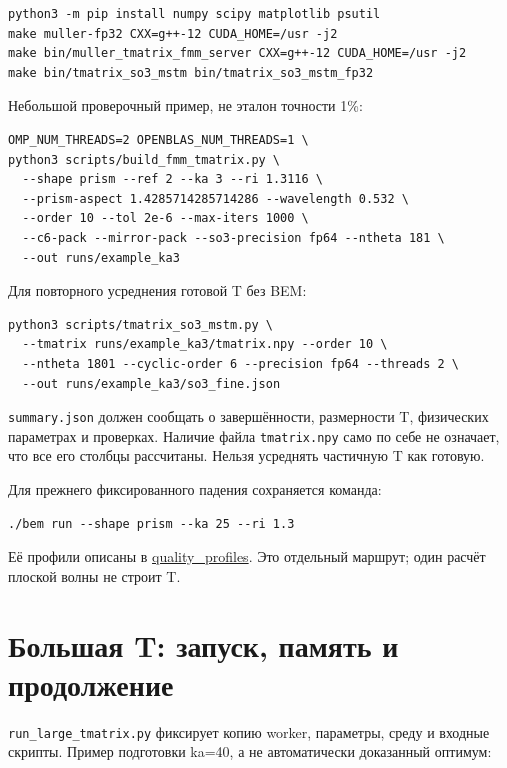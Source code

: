 \documentclass[
  russian,
  11pt,
  a4paper,
]{report}
\begin{document}
\begin{verbatim}
python3 -m pip install numpy scipy matplotlib psutil
make muller-fp32 CXX=g++-12 CUDA_HOME=/usr -j2
make bin/muller_tmatrix_fmm_server CXX=g++-12 CUDA_HOME=/usr -j2
make bin/tmatrix_so3_mstm bin/tmatrix_so3_mstm_fp32
\end{verbatim}

Небольшой проверочный пример, не эталон точности 1\%:

\begin{verbatim}
OMP_NUM_THREADS=2 OPENBLAS_NUM_THREADS=1 \
python3 scripts/build_fmm_tmatrix.py \
  --shape prism --ref 2 --ka 3 --ri 1.3116 \
  --prism-aspect 1.4285714285714286 --wavelength 0.532 \
  --order 10 --tol 2e-6 --max-iters 1000 \
  --c6-pack --mirror-pack --so3-precision fp64 --ntheta 181 \
  --out runs/example_ka3
\end{verbatim}

Для повторного усреднения готовой T без BEM:

\begin{verbatim}
python3 scripts/tmatrix_so3_mstm.py \
  --tmatrix runs/example_ka3/tmatrix.npy --order 10 \
  --ntheta 1801 --cyclic-order 6 --precision fp64 --threads 2 \
  --out runs/example_ka3/so3_fine.json
\end{verbatim}

\nolinkurl{summary.json} должен сообщать о завершённости, размерности T,
физических параметрах и проверках. Наличие файла \nolinkurl{tmatrix.npy}
само по себе не означает, что все его столбцы рассчитаны. Нельзя
усреднять частичную T как готовую.

Для прежнего фиксированного падения сохраняется команда:

\begin{verbatim}
./bem run --shape prism --ka 25 --ri 1.3
\end{verbatim}

Её профили описаны в \href{docs/quality_profiles.md}{quality\_profiles}.
Это отдельный маршрут; один расчёт плоской волны не строит T.

\chapter{Большая T: запуск, память и
продолжение}\label{ux431ux43eux43bux44cux448ux430ux44f-t-ux437ux430ux43fux443ux441ux43a-ux43fux430ux43cux44fux442ux44c-ux438-ux43fux440ux43eux434ux43eux43bux436ux435ux43dux438ux435}

\nolinkurl{run_large_tmatrix.py} фиксирует копию worker, параметры,
среду и входные скрипты. Пример подготовки ka=40, а не автоматически
доказанный оптимум:
\end{document}
